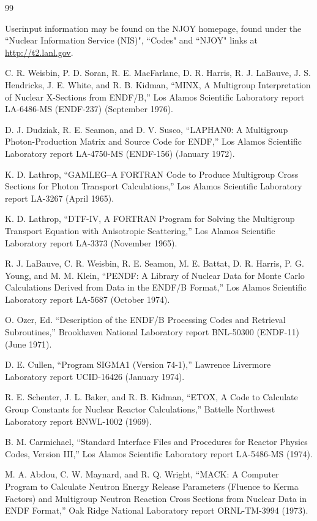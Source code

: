 \documentclass[11pt,twoside]{NJOYMan}
\begin{document}
\begin{thebibliography}{99}
\begin{singlespace}
 Userinput information may be found on
 the NJOY homepage, found under the ``Nuclear Information
 Service (NIS)", ``Codes" and ``NJOY" links at
 \href{http://t2.lanl.gov}{http://t2.lanl.gov}.

 C. R. Weisbin, P. D. Soran, R. E. MacFarlane,
  D. R. Harris, R. J. LaBauve, J. S. Hendricks, J. E. White,
  and R. B. Kidman, ``MINX, A Multigroup Interpretation of
  Nuclear X-Sections from ENDF/B,'' Los Alamos Scientific
  Laboratory report LA-6486-MS (ENDF-237) (September 1976).

 D. J. Dudziak, R. E. Seamon, and D. V. Susco,
  ``LAPHAN0:  A Multigroup Photon-Production Matrix and Source
  Code for ENDF,'' Los Alamos Scientific Laboratory report
  LA-4750-MS (ENDF-156) (January 1972).

 K. D. Lathrop, ``GAMLEG--A FORTRAN Code to
  Produce Multigroup Cross Sections for Photon Transport Calculations,''
  Los Alamos Scientific Laboratory report LA-3267 (April 1965).

 K. D. Lathrop, ``DTF-IV, A FORTRAN Program for
  Solving the Multigroup Transport Equation with Anisotropic
  Scattering,'' Los Alamos Scientific Laboratory report
  LA-3373 (November 1965).

 R. J. LaBauve, C. R. Weisbin, R. E. Seamon,
  M. E. Battat, D. R. Harris, P. G. Young, and M. M. Klein,
  ``PENDF: A Library of Nuclear Data for Monte Carlo
  Calculations Derived from Data in the ENDF/B Format,''
  Los Alamos Scientific Laboratory report LA-5687 (October 1974).

 O. Ozer, Ed. ``Description of the ENDF/B
  Processing Codes and Retrieval Subroutines,'' Brookhaven
  National Laboratory report BNL-50300 (ENDF-11) (June 1971).

 D. E. Cullen, ``Program SIGMA1 (Version 74-1),''
  Lawrence Livermore Laboratory report UCID-16426 (January 1974).

 R. E. Schenter, J. L. Baker, and R. B. Kidman,
  ``ETOX, A Code to Calculate Group Constants for Nuclear Reactor
  Calculations,'' Battelle Northwest Laboratory report
  BNWL-1002 (1969).

 B. M. Carmichael, ``Standard Interface Files and
  Procedures for Reactor Physics Codes, Version III,'' Los Alamos
  Scientific Laboratory report LA-5486-MS (1974).

 M. A. Abdou, C. W. Maynard, and R. Q. Wright,
  ``MACK: A Computer Program to Calculate Neutron Energy Release
  Parameters (Fluence to Kerma Factors) and Multigroup
  Neutron Reaction Cross Sections from Nuclear Data in ENDF
  Format,'' Oak Ridge National Laboratory report ORNL-TM-3994
  (1973).


\end{singlespace}
\end{thebibliography}
\end{document}
